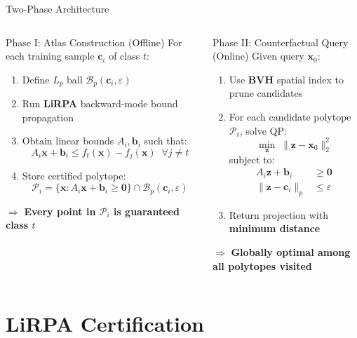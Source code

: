 \documentclass[aspectratio=169, 10pt]{beamer}
\newcommand{\vx}{\mathbf{x}}
\newcommand{\vz}{\mathbf{z}}
\newcommand{\vb}{\mathbf{b}}
\newcommand{\vc}{\mathbf{c}}
\newcommand{\Bp}{\mathcal{B}_p}
\newcommand{\PP}{\mathcal{P}}
\begin{document}
\begin{frame}{Two-Phase Architecture}

\begin{columns}[T]
\begin{block}{Phase I: Atlas Construction (Offline)}
  For each training sample $\vc_i$ of class $t$:
  \begin{enumerate}
    \item Define $L_p$ ball $\Bp(\vc_i, \varepsilon)$
    \item Run \textbf{LiRPA} backward-mode bound propagation
    \item Obtain linear bounds $A_i, \vb_i$ such that:
      \[
        A_i \vx + \vb_i \leq f_t(\vx) - f_j(\vx) \;\;\forall j \neq t
      \]
    \item Store certified polytope:
      \[
        \PP_i = \bigl\{\vx : A_i \vx + \vb_i \geq \mathbf{0}\bigr\} \cap \Bp(\vc_i, \varepsilon)
      \]
  \end{enumerate}
  \medskip
  $\Rightarrow$ \textbf{Every point in $\PP_i$ is guaranteed class $t$}
\end{block}

\begin{block}{Phase II: Counterfactual Query (Online)}
  Given query $\vx_0$:
  \begin{enumerate}
    \item Use \textbf{BVH} spatial index to prune candidates
    \item For each candidate polytope $\PP_i$, solve QP:
      \[
        \min_{\vz}\; \|\vz - \vx_0\|_2^2
      \]
      subject to:
      \begin{align*}
        A_i\vz + \vb_i &\geq \mathbf{0} \\
        \|\vz - \vc_i\|_p &\leq \varepsilon
      \end{align*}
    \item Return projection with \textbf{minimum distance}
  \end{enumerate}
  \medskip
  $\Rightarrow$ \textbf{Globally optimal among all polytopes visited}
\end{block}
\end{columns}

\end{frame}

\section{LiRPA Certification}
\end{document}
